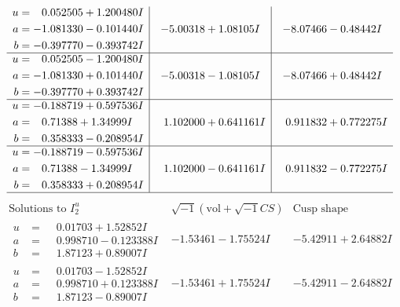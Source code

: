 \documentclass[1p]{elsarticle_modified}
\theoremstyle{definition}
\newcommand{\I}{\sqrt{-1}}
\begin{document}
$$\begin{array}{c|c|c}
\begin{aligned}
u &= \phantom{-}0.052505 + 1.200480 I \\
a &= -1.081330 - 0.101440 I \\
b &= -0.397770 - 0.393742 I\end{aligned}
 & -5.00318 + 1.08105 I & -8.07466 - 0.48442 I \\ \hline\begin{aligned}
u &= \phantom{-}0.052505 - 1.200480 I \\
a &= -1.081330 + 0.101440 I \\
b &= -0.397770 + 0.393742 I\end{aligned}
 & -5.00318 - 1.08105 I & -8.07466 + 0.48442 I \\ \hline\begin{aligned}
u &= -0.188719 + 0.597536 I \\
a &= \phantom{-}0.71388 + 1.34999 I \\
b &= \phantom{-}0.358333 - 0.208954 I\end{aligned}
 & \phantom{-}1.102000 + 0.641161 I & \phantom{-}0.911832 + 0.772275 I \\ \hline\begin{aligned}
u &= -0.188719 - 0.597536 I \\
a &= \phantom{-}0.71388 - 1.34999 I \\
b &= \phantom{-}0.358333 + 0.208954 I\end{aligned}
 & \phantom{-}1.102000 - 0.641161 I & \phantom{-}0.911832 - 0.772275 I\\
 \hline 
 \end{array}$$\newpage$$\begin{array}{c|c|c}  
\text{Solutions to }I^u_{2}& \I (\text{vol} + \sqrt{-1}CS) & \text{Cusp shape}\\
 \hline 
\begin{aligned}
u &= \phantom{-}0.01703 + 1.52852 I \\
a &= \phantom{-}0.998710 - 0.123388 I \\
b &= \phantom{-}1.87123 + 0.89007 I\end{aligned}
 & -1.53461 - 1.75524 I & -5.42911 + 2.64882 I \\ \hline\begin{aligned}
u &= \phantom{-}0.01703 - 1.52852 I \\
a &= \phantom{-}0.998710 + 0.123388 I \\
b &= \phantom{-}1.87123 - 0.89007 I\end{aligned}
 & -1.53461 + 1.75524 I & -5.42911 - 2.64882 I \\ \hline\begin{aligned}

\end{aligned}
\end{array}$$
\end{document}
